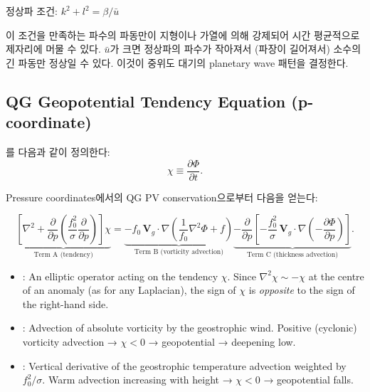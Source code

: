 \begin{hisublock}
정상파 조건: $k^2 + l^2 = \beta/\bar{u}$

이 조건을 만족하는 파수의 파동만이 지형이나 가열에 의해 강제되어
시간 평균적으로 제자리에 머물 수 있다.
$\bar{u}$가 크면 정상파의 파수가 작아져서 (파장이 길어져서) 소수의 긴 파동만
정상일 수 있다.  이것이 중위도 대기의 planetary wave 패턴을 결정한다.
\end{hisublock}

\subsection{QG Geopotential Tendency Equation (p-coordinate)}
\label{subsec:geopot-tendency}

를 다음과 같이 정의한다:
\begin{equation}\label{eq:chi-def}
  \chi \equiv \frac{\partial\Phi}{\partial t}.
\end{equation}

\noindent
Pressure coordinates에서의 QG PV conservation으로부터 다음을 얻는다:

\begin{equation}\label{eq:geopot-tendency}
  \boxed{
  \underbrace{
    \left[\nabla^2
    + \frac{\partial}{\partial p}
      \!\left(\frac{f_0^2}{\sigma}\frac{\partial}{\partial p}\right)
    \right]\chi
  }_{\text{Term A (tendency)}}
  = \underbrace{
    -f_0\,\mathbf{V}_g\cdot\nabla
    \!\left(\frac{1}{f_0}\nabla^2\Phi + f\right)
  }_{\text{Term B (vorticity advection)}}
  \underbrace{
    -\frac{\partial}{\partial p}
    \!\left[-\frac{f_0^2}{\sigma}\,
      \mathbf{V}_g\cdot\nabla
      \!\left(-\frac{\partial\Phi}{\partial p}\right)
    \right]
  }_{\text{Term C (thickness advection)}}.
  }
\end{equation}

\begin{remark}
\begin{itemize}
  \item {}: An elliptic operator acting on the tendency $\chi$.
        Since $\nabla^2\chi \sim -\chi$ at the centre of an anomaly (as for
        any Laplacian), the sign of $\chi$ is \emph{opposite} to the sign of
        the right-hand side.
  \item {}: Advection of
        absolute vorticity by the geostrophic wind.
        Positive (cyclonic) vorticity advection → $\chi < 0$ → geopotential
         → deepening low.
  \item {}: Vertical
        derivative of the geostrophic temperature advection weighted by
        $f_0^2/\sigma$.  Warm advection increasing with height →
        $\chi < 0$ → geopotential falls.
\end{itemize}
\end{remark}

